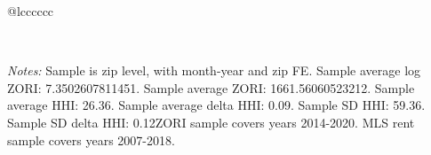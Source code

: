 \begin{table}[H]
{\begin{tabular}{@{\extracolsep{5pt}}lcccccc}
 \hline  

 \hline \\[-1.8ex]  

  {\parbox[t]{\textwidth}{ \textit{Notes:} Sample is zip level, with month-year and zip FE. Sample average log ZORI: 7.3502607811451. Sample average ZORI: 1661.56060523212. Sample average HHI: 26.36. Sample average delta HHI: 0.09. Sample SD HHI: 59.36. Sample SD delta HHI: 0.12ZORI sample covers years 2014-2020. MLS rent sample covers years 2007-2018.}} \\ 

 \end{tabular}}  

 \end{table}  

 



